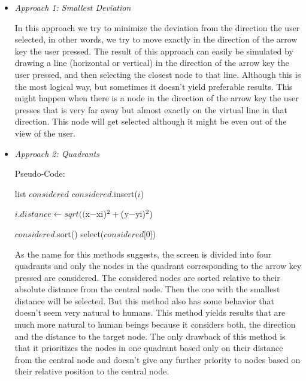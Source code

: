 \begin{itemize} 
\item {\it Approach 1: Smallest Deviation}
\par \noindent
In this approach we try to minimize the deviation from the direction the user selected, in other words, we try to move exactly in the direction of the arrow key the user pressed. The result of this approach can easily be simulated by drawing a line (horizontal or vertical) in the direction of the arrow key the user pressed, and then selecting the closest node to that line. Although this is the most logical way, but sometimes it doesn't yield preferable results. This might happen when there is a node in the direction of the arrow key the user presses that is very far away but almost exactly on the virtual line in that direction. This node will get selected although it might be even out of the view of the user.

\item {\it Approach 2: Quadrants}
\par \noindent
Pseudo-Code:
\par
\begin{algorithmic}
\STATE list $considered$
		\STATE $considered$.insert($i$)
	\ENDIF
\ENDFOR

	\STATE $i.distance\gets sqrt(($x$-$xi$)^{\textnormal{2}}+($y$-$yi$)^{\textnormal{2}})$
\ENDFOR

\STATE $considered$.sort()
\STATE select($considered$[0])
\end{algorithmic}
\par \noindent
As the name for this methods suggests, the screen is divided into four quadrants and only the nodes in the quadrant corresponding to the arrow key pressed are considered. The considered nodes are sorted relative to their absolute distance from the central node. Then the one with the smallest distance will be selected. But this method also has some behavior that doesn't seem very natural to humans. This method yields results that are much more natural to human beings because it considers both, the direction and the distance to the target node. The only drawback of this method is that it prioritizes the nodes in one quadrant based only on their distance from the central node and doesn't give any further priority to nodes based on their relative position to the central node.


\end{itemize}
